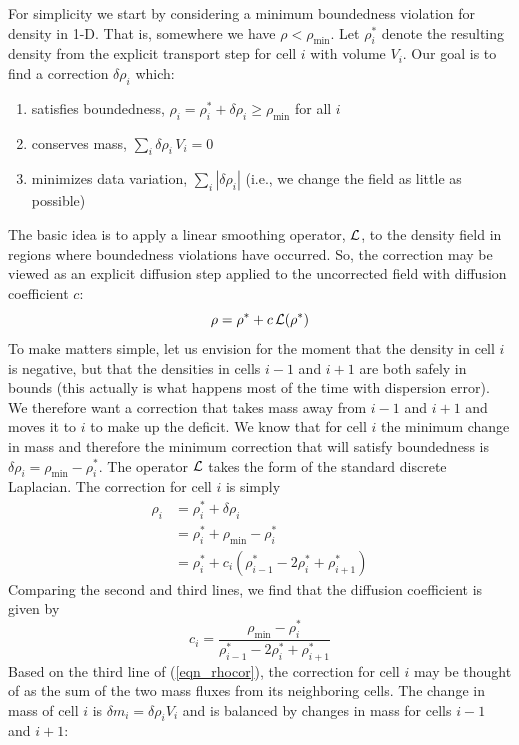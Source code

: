 For simplicity we start by considering a minimum boundedness violation for density in 1-D.  That is, somewhere we have $\rho < \rho_{\min}$.  Let $\rho_i^*$ denote the resulting density from the explicit transport step for cell $i$ with volume $V_i$.  Our goal is to find a correction $\delta \rho_i$ which:
\begin{enumerate}[{(}a{)}]
\item satisfies boundedness, $\rho_i = \rho_i^* + \delta \rho_i \ge \rho_{\min}$ for all $i$
\item conserves mass, $\sum_i \delta \rho_i \, V_i = 0$
\item minimizes data variation, $\sum_i |\delta \rho_i|$ (i.e., we change the field as little as possible)
\end{enumerate}
The basic idea is to apply a linear smoothing operator, $\cal L$, to the density field in regions where boundedness violations have occurred. So, the correction may be viewed as an explicit diffusion step applied to the uncorrected field with diffusion coefficient $c$:
\begin{equation}
\rho = \rho^* + c \, {\cal L} (\rho^*)
\end{equation}
To make matters simple, let us envision for the moment that the density in cell $i$ is negative, but that the densities in cells $i-1$ and $i+1$ are both safely in bounds (this actually is what happens most of the time with dispersion error).  We therefore want a correction that takes mass away from $i-1$ and $i+1$ and moves it to $i$ to make up the deficit.  We know that for cell $i$ the minimum change in mass and therefore the minimum correction that will satisfy boundedness is $\delta \rho_i = \rho_{\min} - \rho_i^*$.  The operator $\cal L$ takes the form of the standard discrete Laplacian.  The correction for cell $i$ is simply
\begin{align}
\label{eqn_rhocor}
\rho_i &= \rho_i^* + \delta \rho_i \nonumber\\
&= \rho_i^* + \rho_{\min} - \rho_i^* \nonumber\\
&=  \rho_i^* + c_i (\rho_{i-1}^* - 2 \rho_i^* + \rho_{i+1}^*)
\end{align}
Comparing the second and third lines, we find that the diffusion coefficient is given by
\begin{equation}
\label{eqn_diffcoef}
c_i = \frac{\rho_{\min} - \rho_i^*}{\rho_{i-1}^* - 2 \rho_i^* + \rho_{i+1}^*}
\end{equation}
Based on the third line of (\ref{eqn_rhocor}), the correction for cell $i$ may be thought of as the sum of the two mass fluxes from its neighboring cells.  The change in mass of cell $i$ is $\delta m_i = \delta \rho_i V_i$ and is balanced by changes in mass for cells $i-1$ and $i+1$:

